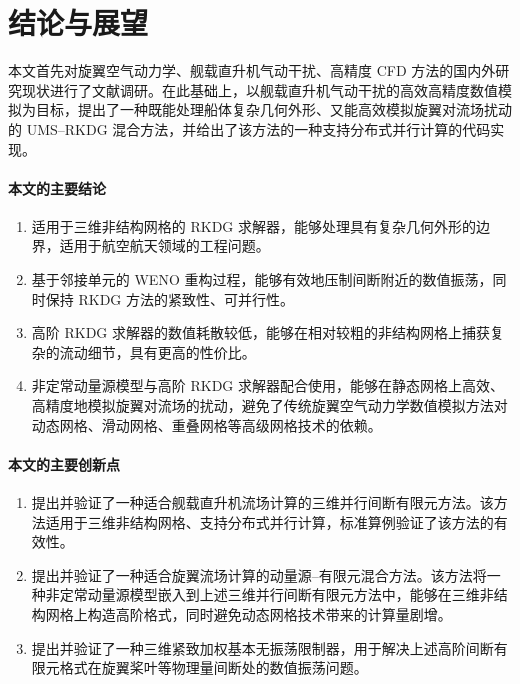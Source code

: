 
\chapter*{结论与展望}


本文首先对旋翼空气动力学、舰载直升机气动干扰、高精度 CFD 方法的国内外研究现状进行了文献调研。在此基础上，以舰载直升机气动干扰的高效高精度数值模拟为目标，提出了一种既能处理船体复杂几何外形、又能高效模拟旋翼对流场扰动的
UMS–RKDG 混合方法，并给出了该方法的一种支持分布式并行计算的代码实现。

\subsubsection*{本文的主要结论}
\begin{enumerate}[wide]
\item 适用于三维非结构网格的 RKDG 求解器，能够处理具有复杂几何外形的边界，适用于航空航天领域的工程问题。
\item 基于邻接单元的 WENO 重构过程，能够有效地压制间断附近的数值振荡，同时保持 RKDG 方法的紧致性、可并行性。
\item 高阶 RKDG 求解器的数值耗散较低，能够在相对较粗的非结构网格上捕获复杂的流动细节，具有更高的性价比。 
\item 非定常动量源模型与高阶 RKDG 求解器配合使用，能够在静态网格上高效、高精度地模拟旋翼对流场的扰动，避免了传统旋翼空气动力学数值模拟方法对动态网格、滑动网格、重叠网格等高级网格技术的依赖。
\end{enumerate}


\subsubsection*{本文的主要创新点}
\begin{enumerate}[wide]
\item 提出并验证了一种适合舰载直升机流场计算的三维并行间断有限元方法。该方法适用于三维非结构网格、支持分布式并行计算，标准算例验证了该方法的有效性。
\item 提出并验证了一种适合旋翼流场计算的动量源–有限元混合方法。该方法将一种非定常动量源模型嵌入到上述三维并行间断有限元方法中，能够在三维非结构网格上构造高阶格式，同时避免动态网格技术带来的计算量剧增。
\item 提出并验证了一种三维紧致加权基本无振荡限制器，用于解决上述高阶间断有限元格式在旋翼桨叶等物理量间断处的数值振荡问题。
\end{enumerate}


